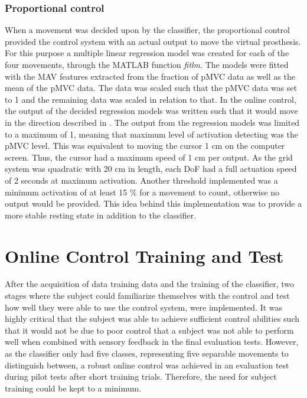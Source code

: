\subsubsection{Proportional control}  
When a movement was decided upon by the classifier, the proportional control provided the control system with an actual output to move the virtual prosthesis. For this purpose a multiple linear regression model was created for each of the four movements, through the MATLAB function \textit{fitlm}. The models were fitted with the MAV features extracted from the fraction of pMVC data as well as the mean of the pMVC data. The data was scaled such that the pMVC data was set to 1 and the remaining data was scaled in relation to that. In the online control, the output of the decided regression models was written such that it would move in the direction described in . The output from the regression models was limited to a maximum of 1, meaning that maximum level of activation detecting was the pMVC level. This was equivalent to moving the cursor 1 cm on the computer screen. Thus, the cursor had a maximum speed of 1 cm per output. As the grid system was quadratic with 20 cm in length, each DoF had a full actuation speed of 2 seconds at maximum activation. Another threshold implemented was a minimum activation of at least 15 $\percent$ for a movement to count, otherwise no output would be provided. This idea behind this implementation was to provide a more stable resting state in addition to the classifier. 


\section{Online Control Training and Test} \label{sec:meth:contraintest}

After the acquisition of data training data and the training of the classifier, two stages where the subject could familiarize themselves with the control and test how well they were able to use the control system, were implemented. It was highly critical that the subject was able to achieve sufficient control abilities such that it would not be due to poor control that a subject was not able to perform well when combined with sensory feedback in the final evaluation tests. However, as the classifier only had five classes, representing five separable movements to distinguish between, a robust online control was achieved in an evaluation test during pilot tests after short training trials. Therefore, the need for subject training could be kept to a minimum.  

